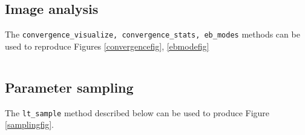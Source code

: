 \documentclass[reprint,aps,prd,superscriptaddress,showkeys,showpacs]{revtex4-1}
\newcommand{\ttt}[1]{\texttt{#1}}
\begin{document}
\subsection{Image analysis}
The \ttt{convergence\_visualize, convergence\_stats, eb\_modes} methods can be used to reproduce Figures \ref{convergencefig}, \ref{ebmodefig}
\begin{widetext}
\inputminted[linenos]{python}{Snippets/image.py}
\end{widetext}

\subsection{Parameter sampling}

The \ttt{lt\_sample} method described below can be used to produce Figure \ref{samplingfig}. 
\begin{widetext}
\inputminted[linenos]{python}{Snippets/sampling.py}
\end{widetext}

\label{lastpage}
\end{document}
